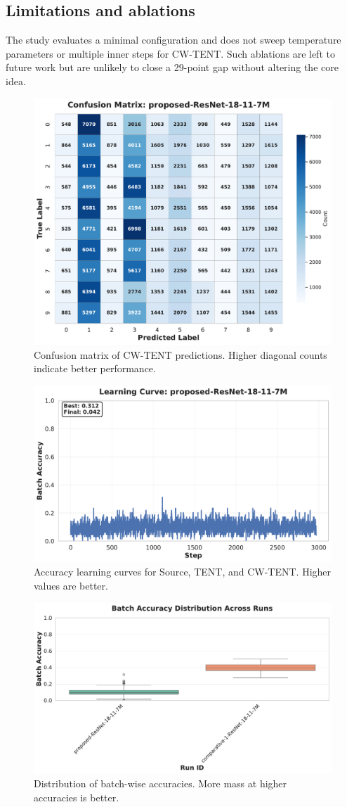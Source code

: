 \documentclass{article} %
\begin{document}
\subsection{Limitations and ablations}
The study evaluates a minimal configuration and does not sweep temperature parameters or multiple inner steps for CW-TENT\@. Such ablations are left to future work but are unlikely to close a 29-point gap without altering the core idea.

\begin{figure}[H]
  \centering
  \includegraphics[width=0.7\linewidth]{images/confusion_matrix.pdf}
  \caption{Confusion matrix of CW-TENT predictions. Higher diagonal counts indicate better performance.}
\end{figure}

\begin{figure}[H]
  \centering
  \includegraphics[width=0.7\linewidth]{images/learning_curve.pdf}
  \caption{Accuracy learning curves for Source, TENT, and CW-TENT\@. Higher values are better.}
\end{figure}

\begin{figure}[H]
  \centering
  \includegraphics[width=0.7\linewidth]{images/batch_acc_distribution.pdf}
  \caption{Distribution of batch-wise accuracies. More mass at higher accuracies is better.}
\end{figure}
\end{document}
